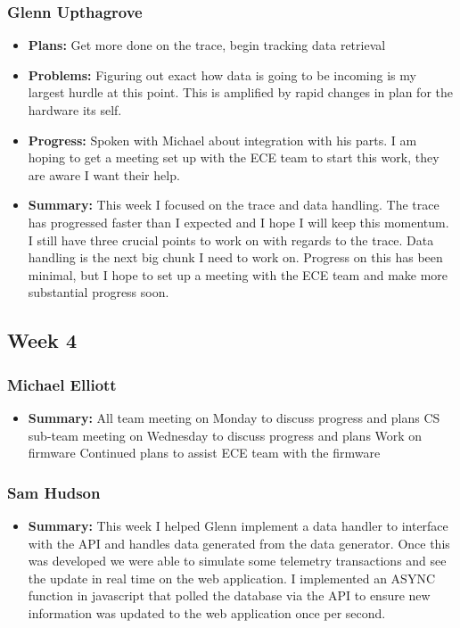 \documentclass[onecolumn, draftclsnofoot,10pt, compsoc]{IEEEtran}
\begin{document}
\subsubsection{Glenn Upthagrove}
\begin {itemize}
 \item \textbf{Plans: }Get more done on the trace, begin tracking data retrieval 
 \item \textbf{Problems: }Figuring out exact how data is going to be incoming is my largest hurdle at this point. This is amplified by rapid changes in plan for the hardware its self. 
 \item \textbf{Progress: }Spoken with Michael about integration with his parts. I am hoping to get a meeting set up with the ECE team to start this work, they are aware I want their help.  
 \item \textbf{Summary: }This week I focused on the trace and data handling. The trace has progressed faster than I expected and I hope I will keep this momentum. I still have three crucial points to work on with regards to the trace. Data handling is the next big chunk I need to work on. Progress on this has been minimal, but I hope to set up a meeting with the ECE team and make more substantial progress soon. 
\end {itemize}
\subsection {Week 4}
\subsubsection{Michael Elliott}
\begin {itemize}
\item \textbf{Summary: }
All team meeting on Monday to discuss progress and plans
CS sub-team meeting on Wednesday to discuss progress and plans
Work on firmware
Continued plans to assist ECE team with the firmware
\end {itemize}
\subsubsection{Sam Hudson}
\begin {itemize}
\item \textbf{Summary: }This week I helped Glenn implement a data handler to interface with the API and handles data generated from the data generator. Once this was developed we were able to simulate some telemetry transactions and see the update in real time on the web application. I implemented an ASYNC function in javascript that polled the database via the API to ensure new information was updated to the web application once per second.
\end {itemize}
\end{document}
